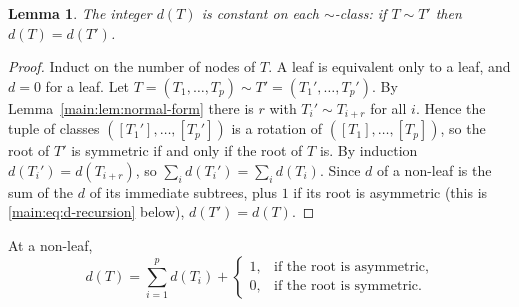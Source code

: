 \documentclass[11pt]{article}
\newtheorem{lemma}[theorem]{Lemma}
\theoremstyle{definition}
\theoremstyle{remark}
\numberwithin{equation}{section}
\numberwithin{figure}{section}
\begin{document}
\begin{lemma}\label{main:lem:d-invariant}
The integer $d(T)$ is constant on each $\sim$-class: if $T\sim T'$ then $d(T)=d(T')$.
\end{lemma}
\begin{proof}
Induct on the number of nodes of $T$.  A leaf is equivalent only to a leaf, and $d=0$ for a leaf.  Let $T=(T_1,\ldots,T_p)\sim T'=(T_1',\ldots,T_p')$.  By Lemma~\ref{main:lem:normal-form} there is $r$ with $T_i'\sim T_{i+r}$ for all $i$.  Hence the tuple of classes $([T_1'],\ldots,[T_p'])$ is a rotation of $([T_1],\ldots,[T_p])$, so the root of $T'$ is symmetric if and only if the root of $T$ is.  By induction $d(T_i')=d(T_{i+r})$, so $\sum_id(T_i')=\sum_id(T_i)$.  Since $d$ of a non-leaf is the sum of the $d$ of its immediate subtrees, plus $1$ if its root is asymmetric (this is \eqref{main:eq:d-recursion} below), $d(T')=d(T)$.
\end{proof}
At a non-leaf,
\begin{equation}\label{main:eq:d-recursion}
 d(T)=\sum_{i=1}^pd(T_i)+
 \begin{cases}
 1,&\text{if the root is asymmetric},\\
 0,&\text{if the root is symmetric}.
 \end{cases}
\end{equation}
\end{document}
